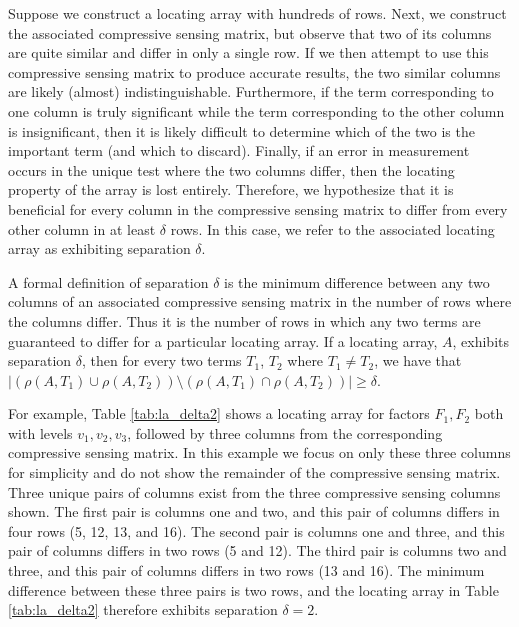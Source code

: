 Suppose we construct a locating array with hundreds of rows.
Next, we construct the associated compressive sensing matrix, but observe that two of its columns are quite similar and differ in only a single row.
If we then attempt to use this compressive sensing matrix to produce accurate results, the two similar columns are likely (almost) indistinguishable.
Furthermore, if the term corresponding to one column is truly significant while the term corresponding to the other column is insignificant, then it is likely difficult to determine which of the two is the important term (and which to discard).
Finally, if an error in measurement occurs in the unique test where the two columns differ, then the locating property of the array is lost entirely.
Therefore, we hypothesize that it is beneficial for every column in the compressive sensing matrix to differ from every other column in at least $\delta$ rows.
In this case, we refer to the associated locating array as exhibiting separation $\delta$.

A formal definition of separation $\delta$ is the minimum difference between any two columns of an associated compressive sensing matrix in the number of rows where the columns differ.
Thus it is the number of rows in which any two terms are guaranteed to differ for a particular locating array.
If a locating array, $A$, exhibits separation $\delta$, then for every two terms $T_1$, $T_2$ where $T_1 \neq T_2$, we have that $|(\rho(A,T_1) \cup \rho(A,T_2)) \setminus (\rho(A,T_1) \cap \rho(A,T_2))| \geq \delta$.

For example, Table \ref{tab:la_delta2} shows a locating array for factors $F_1, F_2$ both with levels $v_1, v_2, v_3$, followed by three columns from the corresponding compressive sensing matrix.
In this example we focus on only these three columns for simplicity and do not show the remainder of the compressive sensing matrix.
Three unique pairs of columns exist from the three compressive sensing columns shown.
The first pair is columns one and two, and this pair of columns differs in four rows (5, 12, 13, and 16).
The second pair is columns one and three, and this pair of columns differs in two rows (5 and 12).
The third pair is columns two and three, and this pair of columns differs in two rows (13 and 16).
The minimum difference between these three pairs is two rows, and the locating array in Table \ref{tab:la_delta2} therefore exhibits separation $\delta=2$.

